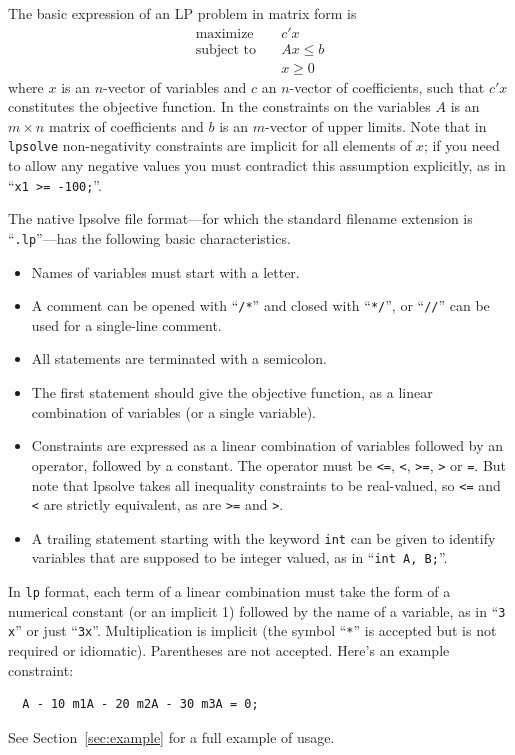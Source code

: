 \documentclass{article}
\begin{document}
The basic expression of an LP problem in matrix form is
\begin{align*}
  \mbox{maximize} & \quad c'x \\
  \mbox{subject to} & \quad Ax \leq b \\
  & \quad x \geq 0
\end{align*}
where $x$ is an $n$-vector of variables and $c$ an $n$-vector of
coefficients, such that $c'x$ constitutes the objective function. In
the constraints on the variables $A$ is an $m\times n$ matrix of
coefficients and $b$ is an $m$-vector of upper limits. Note that in
\texttt{lpsolve} non-negativity constraints are implicit for all
elements of $x$; if you need to allow any negative values you must
contradict this assumption explicitly, as in ``\texttt{x1 >= -100;}''.

The native \textsf{lpsolve} file format---for which the standard
filename extension is ``\texttt{.lp}''---has the following
basic characteristics.
\begin{itemize}
\item Names of variables must start with a letter.
\item A comment can be opened with ``\texttt{/*}'' and closed with
  ``\texttt{*/}'', or ``\texttt{//}'' can be used for a single-line
  comment.
\item All statements are terminated with a semicolon.
\item The first statement should give the objective function, as a
  linear combination of variables (or a single variable).
\item Constraints are expressed as a linear combination of variables
  followed by an operator, followed by a constant.  The operator must
  be \texttt{<=}, \texttt{<}, \texttt{>=}, \texttt{>} or \texttt{=}.
  But note that \textsf{lpsolve} takes all inequality constraints to
  be real-valued, so \texttt{<=} and \texttt{<} are strictly
  equivalent, as are \texttt{>=} and \texttt{>}.
\item A trailing statement starting with the keyword \texttt{int} can
  be given to identify variables that are supposed to be integer
  valued, as in ``\texttt{int A, B;}''.
\end{itemize}

In \texttt{lp} format, each term of a linear combination must take the
form of a numerical constant (or an implicit 1) followed by the name
of a variable, as in ``\texttt{3 x}'' or just
``\texttt{3x}''. Multiplication is implicit (the symbol ``\texttt{*}''
is accepted but is not required or idiomatic). Parentheses are not
accepted. Here's an example constraint:
\begin{verbatim}
  A - 10 m1A - 20 m2A - 30 m3A = 0;
\end{verbatim}
See Section~\ref{sec:example} for a full example of usage.
\end{document}
